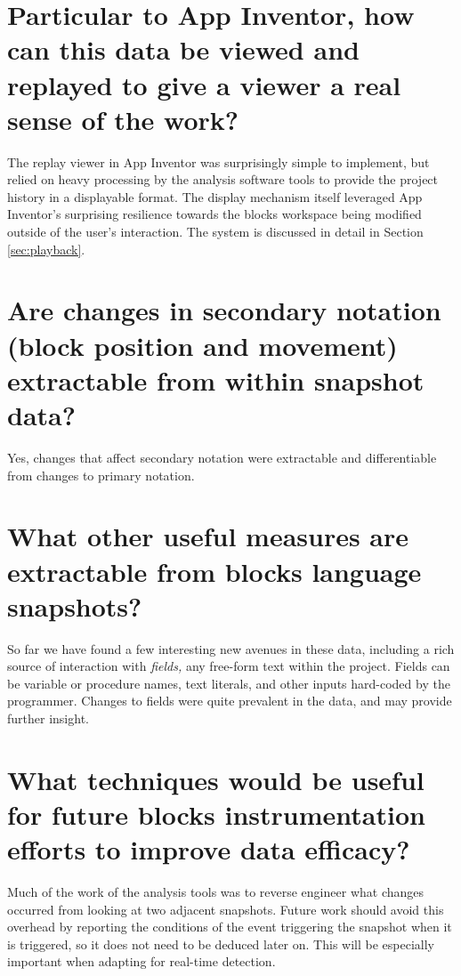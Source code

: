 \section{Particular to App Inventor, how can this data be viewed and replayed to give a viewer a real sense of the work?}
The replay viewer in App Inventor was surprisingly simple to implement, but relied on heavy processing by the analysis software tools to provide the project history in a displayable format. The display mechanism itself leveraged App Inventor's surprising resilience towards the blocks workspace being modified outside of the user's interaction. The system is discussed in detail in Section \ref{sec:playback}.

\section{Are changes in secondary notation (block position and movement) extractable from within snapshot data?}
Yes, changes that affect secondary notation were extractable and differentiable from changes to primary notation.

\section{What other useful measures are extractable from blocks language snapshots?}
So far we have found a few interesting new avenues in these data, including a rich source of interaction with \emph{fields,} any free-form text within the project. Fields can be variable or procedure names, text literals, and other inputs hard-coded by the programmer. Changes to fields were quite prevalent in the data, and may provide further insight.

\section{What techniques would be useful for future blocks instrumentation efforts to improve data efficacy?}
Much of the work of the analysis tools was to reverse engineer what changes occurred from looking at two adjacent snapshots. Future work should avoid this overhead by reporting the conditions of the event triggering the snapshot when it is triggered, so it does not need to be deduced later on. This will be especially important when adapting for real-time detection.

